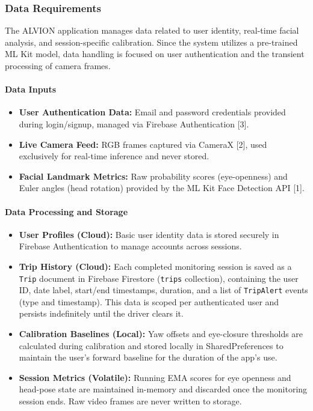 \documentclass[11pt]{report}
\begin{document}
\subsubsection{Data Requirements}
The ALVION application manages data related to user identity, real-time facial analysis, and session-specific calibration. Since the system utilizes a pre-trained ML Kit model, data handling is focused on user authentication and the transient processing of camera frames.

\paragraph{Data Inputs}
\begin{itemize}
    \item \textbf{User Authentication Data:} Email and password credentials provided during login/signup, managed via Firebase Authentication [3].
    \item \textbf{Live Camera Feed:} RGB frames captured via CameraX [2], used exclusively for real-time inference and never stored.
    \item \textbf{Facial Landmark Metrics:} Raw probability scores (eye-openness) and Euler angles (head rotation) provided by the ML Kit Face Detection API [1].
\end{itemize}

\paragraph{Data Processing and Storage}
\begin{itemize}
    \item \textbf{User Profiles (Cloud):} Basic user identity data is stored securely in Firebase Authentication to manage accounts across sessions.
    \item \textbf{Trip History (Cloud):} Each completed monitoring session is saved as a \texttt{Trip} document in Firebase Firestore (\texttt{trips} collection), containing the user ID, date label, start/end timestamps, duration, and a list of \texttt{TripAlert} events (type and timestamp). This data is scoped per authenticated user and persists indefinitely until the driver clears it.
    \item \textbf{Calibration Baselines (Local):} Yaw offsets and eye-closure thresholds are calculated during calibration and stored locally in SharedPreferences to maintain the user's forward baseline for the duration of the app's use.
    \item \textbf{Session Metrics (Volatile):} Running EMA scores for eye openness and head-pose state are maintained in-memory and discarded once the monitoring session ends. Raw video frames are never written to storage.
\end{itemize}
\end{document}
